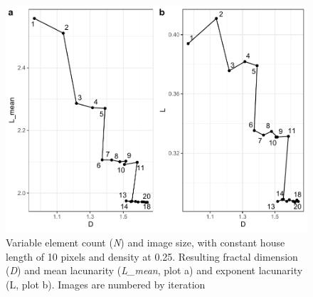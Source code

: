 \documentclass[
  12pt,
]{book}
\begin{document}
\begin{figure}

{\centering \includegraphics[width=0.9\linewidth]{bookdown-demo_files/figure-latex/08-N-IS-1} 

}

\caption{Variable element count (\emph{N}) and image size, with constant house length of 10 pixels and density at 0.25. Resulting fractal dimension (\emph{D}) and mean lacunarity (\emph{L\_mean}, plot a) and exponent lacunarity (L, plot b). Images are numbered by iteration}\label{fig:08-N-IS}
\end{figure}
\end{document}
